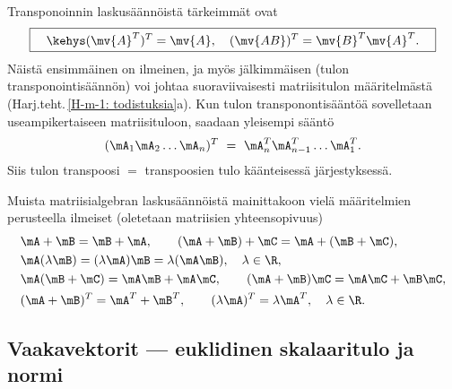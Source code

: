 Transponoinnin laskusäännöistä tärkeimmät ovat
\[ 
\boxed{ \quad \kehys (\mv{A}^T)^T = \mv{A}, \quad (\mv{AB})^T =  \mv{B}^T \mv{A}^T. \quad } 
\]
Näistä ensimmäinen on ilmeinen, ja myös jälkimmäisen (tulon transponointisäännön) voi johtaa 
suoraviivaisesti matriisitulon määritelmästä (Harj.teht.\,\ref{H-m-1: todistuksia}a). Kun tulon
transponontisääntöä sovelletaan useampikertaiseen matriisituloon, saadaan yleisempi sääntö
\[ 
(\mA_1 \mA_2 \ldots \mA_n)^T\ =\ \mA_n^T \mA_{n-1}^T \ldots \mA_1^T. 
\]
Siis tulon transpoosi $=$ transpoosien tulo käänteisessä järjestyksessä. 

Muista matriisialgebran laskusäännöistä mainittakoon vielä määritelmien perusteella ilmeiset 
(oletetaan matriisien yhteensopivuus)
\[ 
\begin{aligned}
&\mA + \mB = \mB + \mA, \quad\quad (\mA + \mB) + \mC = \mA + (\mB + \mC), \\ 
&\mA(\lambda \mB) = (\lambda \mA) \mB = \lambda (\mA\mB), \quad \lambda \in \R, \\
&\mA(\mB + \mC) = \mA\mB + \mA\mC, \quad\quad (\mA + \mB) \mC = \mA\mC + \mB\mC, \\
&(\mA + \mB)^T = \mA^T + \mB^T, \quad\quad (\lambda \mA)^T = \lambda \mA^T, \quad \lambda \in \R.
\end{aligned} 
\]

\subsection*{Vaakavektorit --- euklidinen skalaaritulo ja normi}

